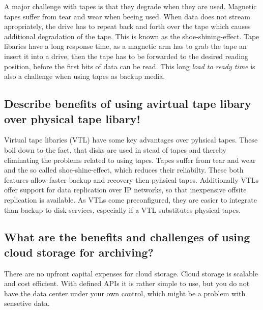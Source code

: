 	A major challenge with tapes is that they degrade when they are used.
	Magnetic tapes suffer from tear and wear when beeing used.
	When data does not stream apropriately,
	the drive has to repeat back and forth over the tape
	which causes additional degradation of the tape.
	This is known as the shoe-shining-effect.
	Tape libaries have a long response time,
	as a magnetic arm has to grab the tape an insert it into a drive,
	then the tape has to be forwarded to the desired reading position,
	before the first bits of data can be read.
	This long \textsl{load to ready time} is also a challenge when using tapes as backup media.

\subsection{Describe benefits of using avirtual tape libary over physical tape libary!} %
\label{sub:describe_benefits_of_using_avirtual_tape_libary_over_physical_tape_libary}
	Virtual tape libaries (VTL) have some key advantages over pyhsical tapes.
	These boil down to the fact,
	that disks are used in stead of tapes
	and thereby eliminating the problems related to using tapes.
	Tapes suffer from tear and wear and the so called shoe-shine-effect,
	which reduces their reliabilty.
	These both features allow faster backup and recovery
	then pyhsical tapes.
	Additionally VTLs offer support for data replication over IP networks,
	so that inexpensive offsite replication is available.
	As VTLs come preconfigured,
	they are easier to integrate than backup-to-disk services,
	especially if a VTL substitutes physical tapes.

\subsection{What are the benefits and challenges of using cloud storage for archiving?} %
\label{sub:what_are_the_benefits_and_challenges_of_using_cloud_storage_for_archiving}
	There are no upfront capital expenses for cloud storage.
	Cloud storage is scalable and cost efficient.
	With defined APIs it is rather simple to use,
	but you do not have the data center under your own control,
	which might be a problem with sensetive data.

